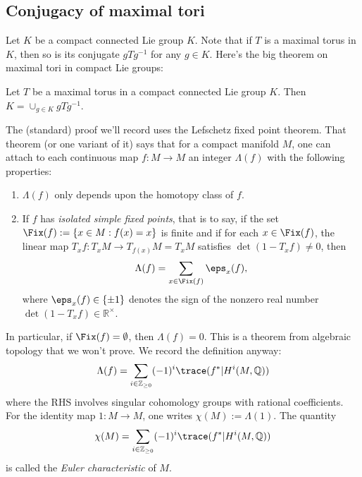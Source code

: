 \documentclass[reqno]{amsart} 
\begin{document}
\subsection{Conjugacy of maximal tori}
\label{sec:orgb02c776}
Let $K$ be a compact connected Lie group $K$.  Note that if $T$ is a maximal torus in $K$, then so is its conjugate $g T g^{-1}$ for any $g \in K$.  Here's the big theorem on maximal tori in compact Lie groups:
\begin{theorem}\label{thm:maximal-tori-conjugates-exhaust-K}
  Let $T$ be a maximal torus in a compact connected Lie group $K$.  Then $K = \cup_{g \in K} g T g^{-1}$.
\end{theorem}
The (standard) proof we'll record uses the Lefschetz fixed point theorem.  That theorem (or one variant of it) says that for a compact manifold $M$, one can attach to each continuous map $f : M \rightarrow M$ an integer $\Lambda(f)$ with the following properties:
\begin{enumerate}
\item $\Lambda(f)$ only depends upon the homotopy class of $f$.
\item If $f$ has \emph{isolated simple fixed points}, that is to say, if the set $\Fix(f) := \{x \in M : f(x) = x\}$ is finite and if for each $x \in \Fix(f)$, the linear map $T_x f : T_x M \rightarrow T_{f(x)} M = T_x M$ satisfies $\det(1 - T_x f) \neq 0$, then
  \begin{equation*}
    \Lambda(f) = \sum_{x \in \Fix(f)} \eps_x(f),
  \end{equation*}
  where $\eps_x(f) \in \{\pm 1\}$ denotes the sign of the nonzero real number $\det(1 - T_x f) \in \mathbb{R}^\times$.
\end{enumerate}
In particular, if $\Fix(f) = \emptyset$, then $\Lambda(f) = 0$.  This is a theorem from algebraic topology that we won't prove.  We record the definition anyway:
\begin{equation*}
  \Lambda(f) = \sum_{i \in \mathbb{Z}_{\geq 0}} (-1)^i \trace(f^* | H^i(M,\mathbb{Q}))
\end{equation*}
where the RHS involves singular cohomology groups with rational coefficients.  For the identity map $1 : M \rightarrow M$, one writes $\chi(M) := \Lambda(1)$.  The quantity
\begin{equation*}
  \chi(M) = \sum_{i \in \mathbb{Z}_{\geq 0}} (-1)^i \trace(f^* | H^i(M,\mathbb{Q}))
\end{equation*}
is called the \emph{Euler characteristic} of $M$.
\end{document}
